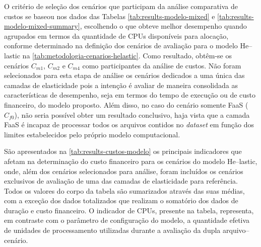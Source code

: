 \documentclass[english,brazilian]{UNISINOSmonografia} %
\begin{document}
O critério de seleção dos cenários que participam da análise comparativa de custos se baseou nos dados das Tabelas \ref{tab:results-modelo-mixed} e \ref{tab:results-modelo-mixed-summary}, escolhendo o que obteve melhor desempenho quando agrupados em termos da quantidade de CPUs disponíveis para alocação, conforme determinado na definição dos cenários de avaliação para o modelo \textsf{He}--lastic na \autoref{tab:metodologia-cenarios-helastic}.
%
Como resultado, obtêm-se os cenários $C_{m1}$, $C_{m2}$ e $C_{m4}$ como participantes da análise de custos.
%
Não foram selecionados para esta etapa de análise os cenários dedicados a uma única das camadas de elasticidade pois a intenção é avaliar de maneira consolidada as características de desempenho, seja em termos do tempo de execução ou de custo financeiro, do modelo proposto.
%
Além disso, no caso do cenário somente FaaS ($C_{f0}$), não seria possível obter um resultado conclusivo, haja vista que a camada FaaS é incapaz de processar todos os arquivos contidos no \textit{dataset} em função dos limites estabelecidos pelo próprio modelo computacional.



São apresentados na \autoref{tab:results-custos-modelo} os principais indicadores que afetam na determinação do custo financeiro para os cenários do modelo \textsf{He}--lastic, onde, além dos cenários selecionados para análise, foram incluídos os cenários exclusivos de avaliação de uma das camadas de elasticidade para referência.
%
Todos os valores do corpo da tabela são sumarizados através das suas médias, com a exceção dos dados totalizados que realizam o somatório dos dados de duração e custo financeiro.
%
O indicador de CPUs, presente na tabela, representa, em contraste com o parâmetro de configuração do modelo, a quantidade efetiva de unidades de processamento utilizadas durante a avaliação da dupla arquivo--cenário.
\end{document}
